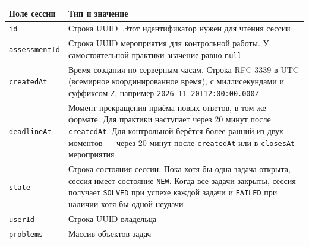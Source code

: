 \documentclass[12pt,a4paper]{article}
\newcounter{none} %
\begin{document}
{\def\LTcaptype{none} %
\begin{longtable}[]{@{}
  >{\raggedright\arraybackslash}p{}
  >{\raggedright\arraybackslash}p{}@{}}
\toprule\noalign{}
\begin{minipage}[b]{\linewidth}\raggedright
Поле сессии
\end{minipage} & \begin{minipage}[b]{\linewidth}\raggedright
Тип и значение
\end{minipage} \\
\midrule\noalign{}
\endhead
\bottomrule\noalign{}
\endlastfoot
\texttt{id} & Строка UUID. Этот идентификатор нужен для чтения сессии \\
\texttt{assessment\allowbreak{}Id} & Строка UUID мероприятия для контрольной работы. У самостоятельной практики значение равно \texttt{null} \\
\texttt{createdAt} & Время создания по серверным часам. Строка RFC 3339 в UTC (всемирное координированное время), с миллисекундами и суффиксом \texttt{Z}, например \texttt{2026-\allowbreak{}11-\allowbreak{}20T12:00:00.\allowbreak{}000Z} \\
\texttt{deadlineAt} & Момент прекращения приёма новых ответов, в том же формате. Для практики наступает через 20 минут после \texttt{createdAt}. Для контрольной берётся более ранний из двух моментов --- через 20 минут после \texttt{createdAt} или в \texttt{closesAt} мероприятия \\
\texttt{state} & Строка состояния сессии. Пока хотя бы одна задача открыта, сессия имеет состояние \texttt{NEW}. Когда все задачи закрыты, сессия получает \texttt{SOLVED} при успехе каждой задачи и \texttt{FAILED} при наличии хотя бы одной неудачи \\
\texttt{userId} & Строка UUID владельца \\
\texttt{problems} & Массив объектов задач \\
\end{longtable}
}
\end{document}
